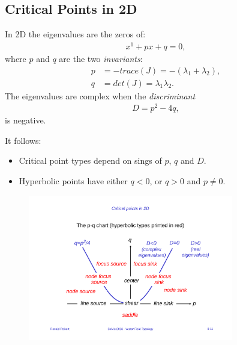 \subsection{Critical Points in 2D}
In 2D the eigenvalues are the zeros of:
\begin{align*}
    x^1 +px+q = 0,
\end{align*}
where $p$ and $q$ are the two \emph{invariants}:
    \begin{align*}
        p &= -trace(J) = - (\lambda_1+\lambda_2),\\
        q &= det(J) = \lambda_1\lambda_2.
    \end{align*}
The eigenvalues are complex when the \emph{discriminant} 
    \begin{align*}
        D=p^2 - 4q,
    \end{align*}
    is negative.
    
    It follows:
    \begin{itemize}
        \item Critical point types depend on sings of $p$, $q$ and $D$.
        \item Hyperbolic points have either $q<0$, or $q>0$ and $p\neq 0$. 
    \end{itemize}
    
\begin{figure}[H]
    \centering
    \includegraphics[width=0.8\textwidth]{img/08_pq_chart}
\end{figure}

